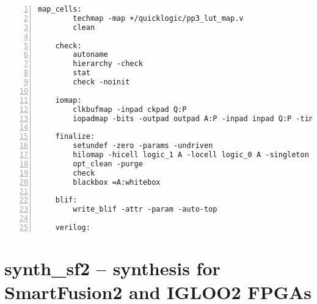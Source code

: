 \begin{lstlisting}[numbers=left,frame=single]
    map_cells:
        techmap -map +/quicklogic/pp3_lut_map.v
        clean

    check:
        autoname
        hierarchy -check
        stat
        check -noinit

    iomap:
        clkbufmap -inpad ckpad Q:P
        iopadmap -bits -outpad outpad A:P -inpad inpad Q:P -tinoutpad bipad EN:Q:A:P A:top

    finalize:
        setundef -zero -params -undriven
        hilomap -hicell logic_1 A -locell logic_0 A -singleton A:top
        opt_clean -purge
        check
        blackbox =A:whitebox

    blif:
        write_blif -attr -param -auto-top 

    verilog:
\end{lstlisting}

\section{synth\_sf2 -- synthesis for SmartFusion2 and IGLOO2 FPGAs}
\label{cmd:synth_sf2}
